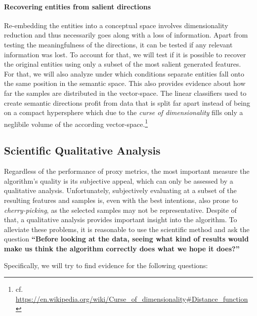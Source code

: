 \paragraph{Recovering entities from salient directions} Re-embedding the entities into a conceptual space involves dimensionality reduction and thus necessarily goes along with a loss of information. Apart from testing the meaningfulness of the directions, it can be tested if any relevant information was lost. To account for that, we will test if it is possible to recover the original entities using only a subset of the most salient generated features. For that, we will also analyze under which conditions separate entities fall onto the same position in the semantic space. This also provides evidence about how far the samples are distributed in the vector-space. The linear classifiers used to create semantic directions profit from data that is split far apart instead of being on a compact hypersphere which due to the \textit{curse of dimensionality} fills only a neglibile volume of the according vector-space.\footnote{cf. \url{https://en.wikipedia.org/wiki/Curse_of_dimensionality\#Distance_function}}

\subsection{Scientific Qualitative Analysis}

Regardless of the performance of proxy metrics, the most important measure the algorithm's quality is its subjective appeal, which can only be assessed by a qualitative analysis. Unfortunately, subjectively evaluating at a subset of the resulting features and samples is, even with the best intentions, also prone to  \textit{cherry-picking}, as the selected samples may not be representative. Despite of that, a qualitative analysis provides important insight into the algorithm. To alleviate these problems, it is reasonable to use the scientific method and ask the question \textbf{``Before looking at the data, seeing what kind of results would make us think the algorithm correctly does what we hope it does?''}

Specifically, we will try to find evidence for the following questions:

